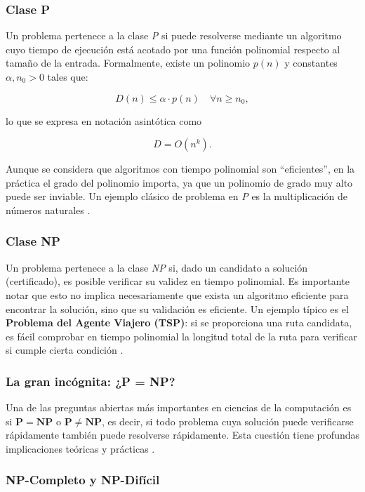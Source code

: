\documentclass[12pt,titlepage,twoside,openright]{book}
\begin{document}
\subsubsection*{Clase P}
Un problema pertenece a la clase \emph{P} si puede resolverse mediante un algoritmo cuyo tiempo de ejecución está acotado por una función polinomial respecto al tamaño de la entrada. Formalmente, existe un polinomio \(p(n)\) y constantes \(\alpha, n_0 > 0\) tales que:

\[
	D(n) \leq \alpha \cdot p(n) \quad \forall n \geq n_0,
\]

lo que se expresa en notación asintótica como

\[
	D = O(n^k).
\]

Aunque se considera que algoritmos con tiempo polinomial son “eficientes”, en la práctica el grado del polinomio importa, ya que un polinomio de grado muy alto puede ser inviable. Un ejemplo clásico de problema en \emph{P} es la multiplicación de números naturales \citep{Flores2014}.

\subsubsection*{Clase NP}
Un problema pertenece a la clase \emph{NP} si, dado un candidato a solución (certificado), es posible verificar su validez en tiempo polinomial. Es importante notar que esto no implica necesariamente que exista un algoritmo eficiente para encontrar la solución, sino que su validación es eficiente. Un ejemplo típico es el \textbf{Problema del Agente Viajero (TSP)}: si se proporciona una ruta candidata, es fácil comprobar en tiempo polinomial la longitud total de la ruta para verificar si cumple cierta condición \citep{Flores2014}.

\subsubsection*{La gran incógnita: ¿P = NP?}
Una de las preguntas abiertas más importantes en ciencias de la computación es si \(\mathbf{P = NP}\) o \(\mathbf{P \neq NP}\), es decir, si todo problema cuya solución puede verificarse rápidamente también puede resolverse rápidamente. Esta cuestión tiene profundas implicaciones teóricas y prácticas \citep{maldonado2013problema}.

\subsubsection{NP-Completo y NP-Difícil}
\end{document}
